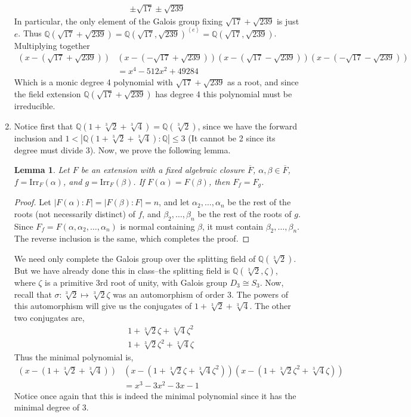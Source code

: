 \documentclass[12pt]{article}
\newtheorem{lemma}{Lemma}
\theoremstyle{definitionstyle}
\def\mbb#1{\mathbb{#1}}
\newcommand{\gen}[1]{\left\langle #1 \right\rangle}
\newcommand{\Q}{\mbb Q}
\begin{document}
\begin{enumerate}[label=(\arabic*)]
			\begin{align*}
				\pm \sqrt{17} \pm \sqrt{239}
			\end{align*}
			In particular, the only element of the Galois group fixing $\sqrt{17}+\sqrt{239}$ is just $e$. Thus $\Q(\sqrt{17}+\sqrt{239}) = \Q(\sqrt{17}, \sqrt{239})^{\gen{e}} = \Q(\sqrt{17},\sqrt{239})$. Multiplying together
			\begin{align*}
				(x-(\sqrt{17}+\sqrt{239}))&(x-(-\sqrt{17}+\sqrt{239}))(x-(\sqrt{17}-\sqrt{239}))(x-(-\sqrt{17}-\sqrt{239}))
				\\ &= x^4-512x^2+49284
			\end{align*}
			Which is a monic degree 4 polynomial with $\sqrt{17}+\sqrt{239}$ as a root, and since the field extension $\Q(\sqrt{17}+\sqrt{239})$ has degree 4 this polynomial must be irreducible.
			
			\item Notice first that $\Q(1+\sqrt[3]{2}+\sqrt[3]{4}) = \Q(\sqrt[3]{2})$, since we have the forward inclusion and $1 < |\Q(1+\sqrt[3]{2}+\sqrt[3]{4}) : \Q| \leq 3$ (It cannot be 2 since its degree must divide 3). Now, we prove the following lemma.
			\begin{lemma}
				Let $F$ be an extension with a fixed algebraic closure $\overline F$, $\alpha, \beta \in \overline F$, $f = \mathrm{Irr}_F(\alpha)$, and $g = \mathrm{Irr}_F(\beta)$. If $F(\alpha) = F(\beta)$, then $F_f = F_g$.
			\end{lemma}
			\begin{proof}
				Let $|F(\alpha) : F| = |F(\beta) : F| = n$, and let $\alpha_2, \ldots, \alpha_n$ be the rest of the roots (not necessarily distinct) of $f$, and $\beta_2, \ldots, \beta_n$ be the rest of the roots of $g$. Since $F_f = F(\alpha, \alpha_2, \ldots, \alpha_n)$ is normal containing $\beta$, it must contain $\beta_2, \ldots, \beta_n$. The reverse inclusion is the same, which completes the proof.
			\end{proof}
			We need only complete the Galois group over the splitting field of $\Q(\sqrt[3]{2})$. But we have already done this in class--the splitting field is $\Q(\sqrt[3]{2}, \zeta)$, where $\zeta$ is a primitive 3rd root of unity, with Galois group $D_3 \cong S_3$. Now, recall that $\sigma: \sqrt[3]{2} \mapsto \sqrt[3]{2}\zeta$ was an automorphism of order 3. The powers of this automorphism will give us the conjugates of $1 + \sqrt[3]{2} + \sqrt[3]{4}$. The other two conjugates are,
			\begin{align*}
				&1 + \sqrt[3]{2}\zeta + \sqrt[3]{4}\zeta^2 \\
				&1 + \sqrt[3]{2}\zeta^2 + \sqrt[3]{4}\zeta
			\end{align*}
			Thus the minimal polynomial is,
			\begin{align*}
				(x-(1 + \sqrt[3]{2} + \sqrt[3]{4}))&(x-(1 + \sqrt[3]{2}\zeta + \sqrt[3]{4}\zeta^2))(x-(1 + \sqrt[3]{2}\zeta^2 + \sqrt[3]{4}\zeta)) 
				\\&= x^3 - 3x^2 - 3x - 1
			\end{align*}
			Notice once again that  this is indeed the minimal polynomial since it has the minimal degree of 3.
		\end{enumerate}
\end{document}
